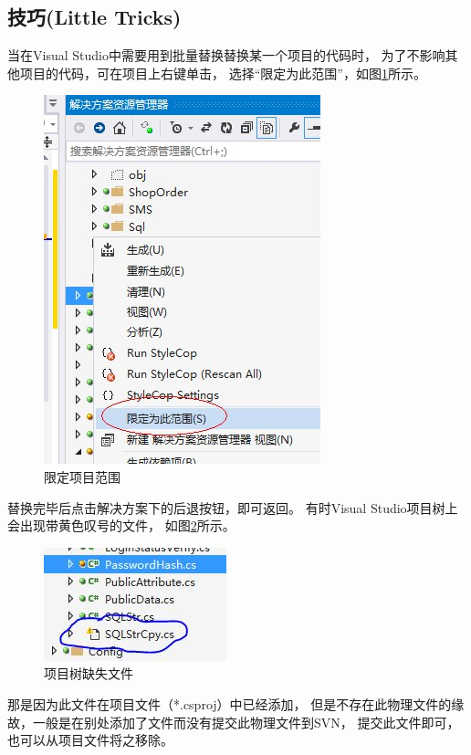 \documentclass{book}
\begin{document}
\subsection{技巧(Little Tricks)}

当在Visual Studio中需要用到批量替换替换某一个项目的代码时，
为了不影响其他项目的代码，可在项目上右键单击，
选择“限定为此范围”，如图\ref{fig:ReplaceInSingleScope}所示。

\begin{figure}[htbp]
	\centering
	\includegraphics[scale=0.6]{ReplaceInSingleScope.jpg}
	\caption{限定项目范围}
	\label{fig:ReplaceInSingleScope}
\end{figure}

替换完毕后点击解决方案下的后退按钮，即可返回。
有时Visual Studio项目树上会出现带黄色叹号的文件，
如图\ref{fig:VisualStudioUncontainedFile}所示。

\begin{figure}[htbp]
	\centering
	\includegraphics[scale=0.8]{VisualStudioUncontainedFile.jpg}
	\caption{项目树缺失文件}
	\label{fig:VisualStudioUncontainedFile}
\end{figure}

那是因为此文件在项目文件（*.csproj）中已经添加，
但是不存在此物理文件的缘故，一般是在别处添加了文件而没有提交此物理文件到SVN，
提交此文件即可，也可以从项目文件将之移除。
\end{document}
